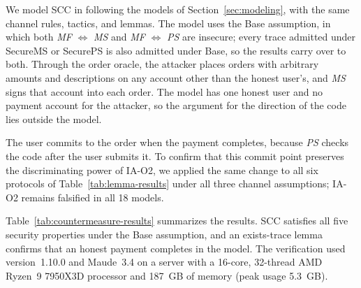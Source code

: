 We model SCC in \Tamarin following the models of Section~\ref{sec:modeling}, with the same channel rules, tactics, and lemmas.
The model uses the Base assumption, in which both \emph{MF} $\Longleftrightarrow$ \emph{MS} and \emph{MF} $\Longleftrightarrow$ \emph{PS} are insecure; every trace admitted under SecureMS or SecurePS is also admitted under Base, so the results carry over to both.
Through the order oracle, the attacker places orders with arbitrary amounts and descriptions on any account other than the honest user's, and \emph{MS} signs that account into each order.
The model has one honest user and no payment account for the attacker, so the argument for the direction of the code lies outside the model.

The user commits to the order when the payment completes, because \emph{PS} checks the code after the user submits it.
To confirm that this commit point preserves the discriminating power of IA-O2, we applied the same change to all six protocols of Table~\ref{tab:lemma-results} under all three channel assumptions; IA-O2 remains falsified in all 18 models.

Table~\ref{tab:countermeasure-results} summarizes the results.
SCC satisfies all five security properties under the Base assumption, and an exists-trace lemma confirms that an honest payment completes in the model.
The verification used \Tamarin version~1.10.0 and Maude~3.4 on a server with a 16-core, 32-thread AMD Ryzen~9 7950X3D processor and 187~GB of memory (peak usage 5.3~GB).
